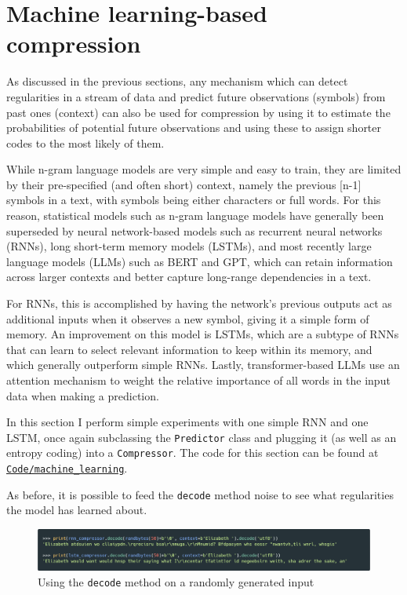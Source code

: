\section{Machine learning-based compression}
\label{sec:machine_learning}

As discussed in the previous sections, any mechanism which can detect regularities in a stream of data and predict future observations (symbols) from past ones (context) can also be used for compression by using it to estimate the probabilities of potential future observations and using these to assign shorter codes to the most likely of them.

While n-gram language models are very simple and easy to train, they are limited by their pre-specified (and often short) context, namely the previous [n-1] symbols in a text, with symbols being either characters or full words. For this reason, statistical models such as n-gram language models have generally been superseded by neural network-based models such as recurrent neural networks (RNNs), long short-term memory models (LSTMs), and most recently large language models (LLMs) such as BERT and GPT, which can retain information across larger contexts and better capture long-range dependencies in a text.

For RNNs, this is accomplished by having the network's previous outputs act as additional inputs when it observes a new symbol, giving it a simple form of memory. An improvement on this model is LSTMs, which are a subtype of RNNs that can learn to select relevant information to keep within its memory, and which generally outperform simple RNNs. Lastly, transformer-based LLMs use an attention mechanism to weight the relative importance of all words in the input data when making a prediction.

In this section I perform simple experiments with one simple RNN and one LSTM, once again subclassing the \texttt{Predictor} class and plugging it (as well as an entropy coding) into a \texttt{Compressor}. The code for this section can be found at \texttt{\href{https://github.com/Guy29/FYP/blob/main/Code/machine_learning}{Code/machine\_learning}}.

As before, it is possible to feed the \texttt{decode} method noise to see what regularities the model has learned about.

\begin{figure}[h]
\centering
\includegraphics[width=\textwidth]{img/ML_decoding_randomness.png}
\caption{Using the \texttt{decode} method on a randomly generated input}
\label{fig:ML_decoding_randomness}
\end{figure}

